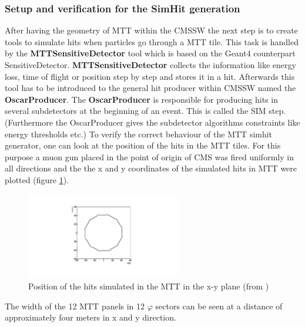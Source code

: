 		\subsubsection{Setup and verification for the SimHit generation}
			After having the geometry of MTT within the CMSSW the next step is to create tools to simulate hits when particles go through a MTT tile.
			This task is handled by the \textbf{MTTSensitiveDetector} tool which is based on the Geant4 counterpart SensitiveDetector.
			\textbf{MTTSensitiveDetector} collects the information like energy loss, time of flight or position step by step and stores it in a hit.
			Afterwards this tool has to be introduced to the general hit producer within CMSSW named the \textbf{OscarProducer}.
			The \textbf{OscarProducer} is responsible for producing hits in several subdetectors at the beginning of an event.
			This is called the SIM step.
			(Furthermore the OscarProducer gives the subdetector algorithms constraints like energy thresholds etc.)
			To verify the correct behaviour of the MTT simhit generator, one can look at the position of the hits in the MTT tiles.
			For this purpose a muon gun placed in the point of origin of CMS was fired uniformly in all directions and the the x and y coordinates of the simulated hits in MTT were plotted (figure
			\ref{fig:hitpos_mtt}).
			\begin{figure}[htbp]
				\centering
				\includegraphics[width=0.6\textwidth]{Figures/erdogan/hitpos_mtt.png}
				\caption{Position of the hits simulated in the MTT in the x-y plane (from \cite{paul_thesis})}
				\label{fig:hitpos_mtt}
			\end{figure}
			The width of the 12 MTT panels in 12 $\varphi$ sectors can be seen at a distance of approximately four meters in x and y direction.
